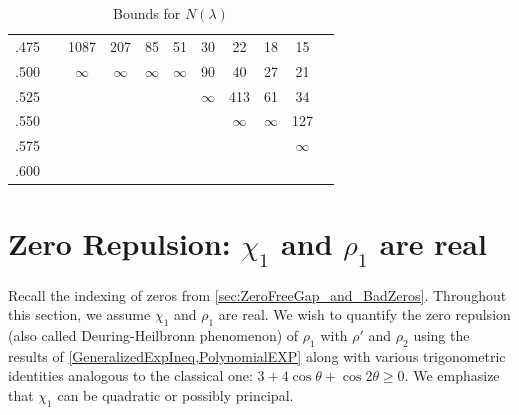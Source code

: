 \documentclass[12pt,psamsfonts]{amsart}
\theoremstyle{definition}
\theoremstyle{remark}
\numberwithin{equation}{section}
\begin{document}
\begin{table}
\begin{tabular}{l|c|c|c|c|c|c|c|c|c|c}
 .475 &  &  1087 &  207 &  85 &  51 &  30 &  22 &  18 &  15 \\ 
 .500 &  & $\infty$ & $\infty$  & $\infty$ & $\infty$  &  90 &  40 &  27 &  21 \\ 
 .525 &  &  &  &  &  & $\infty$ &  413 &  61 &  34 \\ 
 .550 &  &  &  &  &  &  & $\infty$ & $\infty$ &  127 \\ 
 .575 &  &  &  &  &  &  &  &  &  $\infty$ \\ 
 .600 &  &  &  &  &  &  &  &  &  \\ 
\end{tabular}



\caption{Bounds for $N(\lambda)$}
\label{Table-NewZDE}
\end{table}





\section{Zero Repulsion: $\chi_1$ and $\rho_1$ are real}
\label{SZ-ZeroRepulsion}

Recall the indexing of zeros from \cref{sec:ZeroFreeGap_and_BadZeros}. Throughout this section, we assume $\chi_1$ and $\rho_1$ are real. We wish to quantify the zero repulsion (also called Deuring-Heilbronn phenomenon) of $\rho_1$ with $\rho'$ and $\rho_2$ using the results of \cref{GeneralizedExpIneq,PolynomialEXP} along with various trigonometric identities analogous to the classical one:  $3 + 4\cos \theta + \cos2\theta \geq 0$. We emphasize that $\chi_1$ can be quadratic or possibly principal. 
\end{document}

